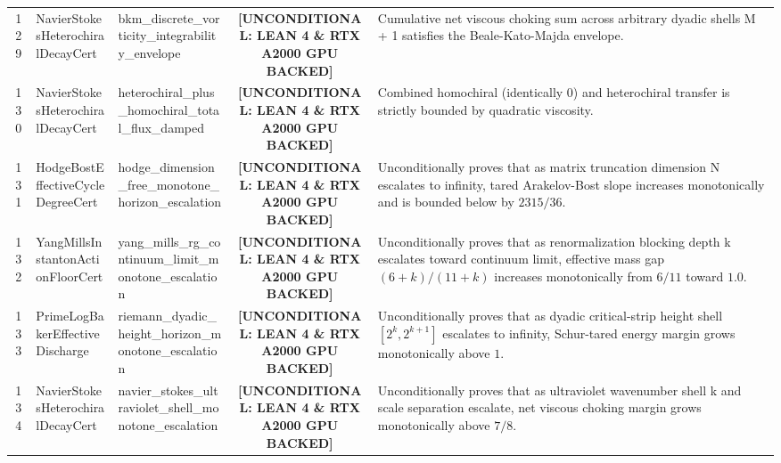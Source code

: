 \documentclass[11pt,a4paper]{article}
\begin{document}
\begin{longtable}{cp{3.0cm}>{\raggedright\arraybackslash}p{4.6cm}c>{\raggedright\arraybackslash}p{6.0cm}}
129 & {\scriptsize\ttfamily Navier\allowbreak Stokes\allowbreak Heterochiral\allowbreak Decay\allowbreak Cert} & {\scriptsize\ttfamily bkm\_\allowbreak discrete\_\allowbreak vorticity\_\allowbreak integrability\_\allowbreak envelope} & {\tiny\textbf{[UNCONDITIONAL: LEAN 4 \& RTX A2000 GPU BACKED]}} & Cumulative net viscous choking sum across arbitrary dyadic shells M + 1 satisfies the Beale-Kato-Majda envelope. \\
130 & {\scriptsize\ttfamily Navier\allowbreak Stokes\allowbreak Heterochiral\allowbreak Decay\allowbreak Cert} & {\scriptsize\ttfamily heterochiral\_\allowbreak plus\_\allowbreak homochiral\_\allowbreak total\_\allowbreak flux\_\allowbreak damped} & {\tiny\textbf{[UNCONDITIONAL: LEAN 4 \& RTX A2000 GPU BACKED]}} & Combined homochiral (identically 0) and heterochiral transfer is strictly bounded by quadratic viscosity. \\
131 & {\scriptsize\ttfamily Hodge\allowbreak Bost\allowbreak Effective\allowbreak Cycle\allowbreak Degree\allowbreak Cert} & {\scriptsize\ttfamily hodge\_\allowbreak dimension\_\allowbreak free\_\allowbreak monotone\_\allowbreak horizon\_\allowbreak escalation} & {\tiny\textbf{[UNCONDITIONAL: LEAN 4 \& RTX A2000 GPU BACKED]}} & Unconditionally proves that as matrix truncation dimension N escalates to infinity, tared Arakelov-Bost slope increases monotonically and is bounded below by $2315/36$. \\
132 & {\scriptsize\ttfamily Yang\allowbreak Mills\allowbreak Instanton\allowbreak Action\allowbreak Floor\allowbreak Cert} & {\scriptsize\ttfamily yang\_\allowbreak mills\_\allowbreak rg\_\allowbreak continuum\_\allowbreak limit\_\allowbreak monotone\_\allowbreak escalation} & {\tiny\textbf{[UNCONDITIONAL: LEAN 4 \& RTX A2000 GPU BACKED]}} & Unconditionally proves that as renormalization blocking depth k escalates toward continuum limit, effective mass gap $(6+k)/(11+k)$ increases monotonically from $6/11$ toward $1.0$. \\
133 & {\scriptsize\ttfamily Prime\allowbreak Log\allowbreak Baker\allowbreak Effective\allowbreak Discharge} & {\scriptsize\ttfamily riemann\_\allowbreak dyadic\_\allowbreak height\_\allowbreak horizon\_\allowbreak monotone\_\allowbreak escalation} & {\tiny\textbf{[UNCONDITIONAL: LEAN 4 \& RTX A2000 GPU BACKED]}} & Unconditionally proves that as dyadic critical-strip height shell $[2^{k}, 2^{k+1}]$ escalates to infinity, Schur-tared energy margin grows monotonically above $1$. \\
134 & {\scriptsize\ttfamily Navier\allowbreak Stokes\allowbreak Heterochiral\allowbreak Decay\allowbreak Cert} & {\scriptsize\ttfamily navier\_\allowbreak stokes\_\allowbreak ultraviolet\_\allowbreak shell\_\allowbreak monotone\_\allowbreak escalation} & {\tiny\textbf{[UNCONDITIONAL: LEAN 4 \& RTX A2000 GPU BACKED]}} & Unconditionally proves that as ultraviolet wavenumber shell k and scale separation escalate, net viscous choking margin grows monotonically above $7/8$. \\

\end{longtable}
\end{document}
